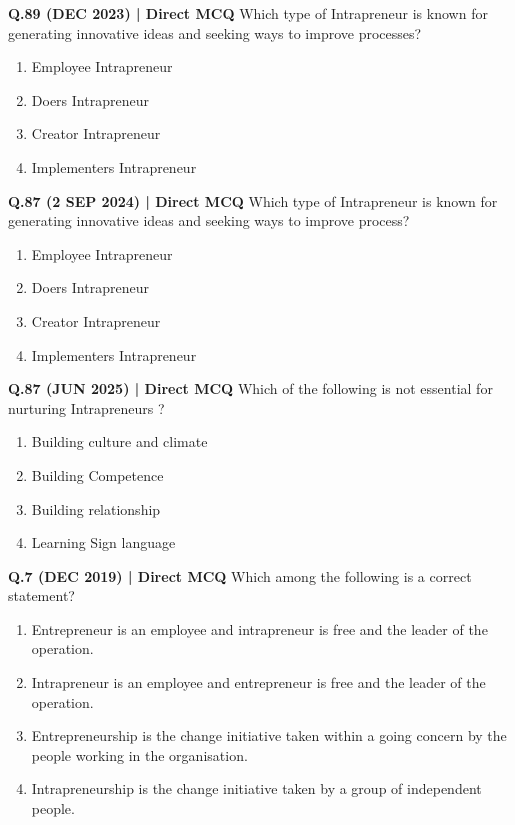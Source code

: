 \documentclass{article}
\begin{document}
\textbf{Q.89 (DEC 2023) | Direct MCQ}
Which type of Intrapreneur is known for generating innovative ideas and seeking ways to improve processes?
\begin{enumerate}[label=(\arabic*)]
    \item Employee Intrapreneur
    \item Doers Intrapreneur
    \item Creator Intrapreneur
    \item Implementers Intrapreneur
\end{enumerate}

\textbf{Q.87 (2 SEP 2024) | Direct MCQ}
Which type of Intrapreneur is known for generating innovative ideas and seeking ways to improve process?
\begin{enumerate}[label=(\arabic*)]
    \item Employee Intrapreneur
    \item Doers Intrapreneur
    \item Creator Intrapreneur
    \item Implementers Intrapreneur
\end{enumerate}

\textbf{Q.87 (JUN 2025) | Direct MCQ}
Which of the following is not essential for nurturing Intrapreneurs ?
\begin{enumerate}[label=(\arabic*)]
    \item Building culture and climate
    \item Building Competence
    \item Building relationship
    \item Learning Sign language
\end{enumerate}

\textbf{Q.7 (DEC 2019) | Direct MCQ}
Which among the following is a correct statement?
\begin{enumerate}[label=(\arabic*)]
    \item Entrepreneur is an employee and intrapreneur is free and the leader of the operation.
    \item Intrapreneur is an employee and entrepreneur is free and the leader of the operation.
    \item Entrepreneurship is the change initiative taken within a going concern by the people working in the organisation.
    \item Intrapreneurship is the change initiative taken by a group of independent people.
\end{enumerate}
\end{document}
